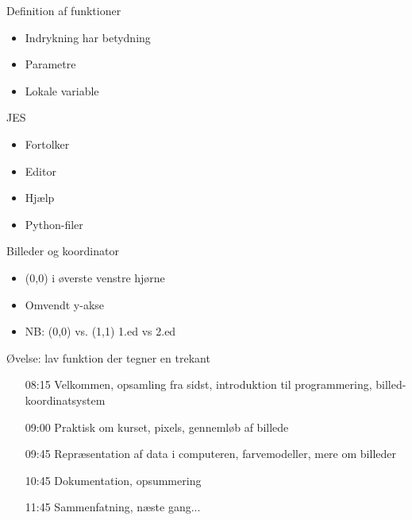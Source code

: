 \documentclass[a4paper,landscape]{slides}
\begin{document}
\begin{slide}
	\begin{center} {\large 
            Definition af funktioner
	} \end{center}
	\begin{itemize} \addtolength{\itemsep}{-\baselineskip}
		\item Indrykning har betydning
		\item Parametre
		\item Lokale variable
	\end{itemize}
\end{slide}

\begin{slide}
	\begin{center} {\large 
            JES
	} \end{center}
	\begin{itemize} \addtolength{\itemsep}{-\baselineskip}
		\item Fortolker
		\item Editor
		\item Hjælp
		\item Python-filer
	\end{itemize}
\end{slide}

\begin{slide}
	\begin{center} {\large 
            Billeder og koordinator
	} \end{center}
	\begin{itemize} \addtolength{\itemsep}{-\baselineskip}
		\item (0,0) i øverste venstre hjørne
		\item Omvendt y-akse 
		\item NB: (0,0) vs. (1,1) 1.ed vs 2.ed
	\end{itemize}
\end{slide}

\begin{slide}
	\begin{center} {\large 
            Øvelse: lav funktion der tegner en trekant 
	} \end{center}
	\begin{itemize} \addtolength{\itemsep}{-\baselineskip}
    		\item[08:15] Velkommen, opsamling fra sidst, introduktion til programmering, billed-koordinatsystem
    		\item[09:00] Praktisk om kurset, pixels, gennemløb af billede
    		\item[09:45] Repræsentation af data i computeren, farvemodeller, mere om billeder
    		\item[10:45] Dokumentation, opsummering
    		\item[11:45] Sammenfatning, næste gang...
	\end{itemize}
\end{slide}
\end{document}

